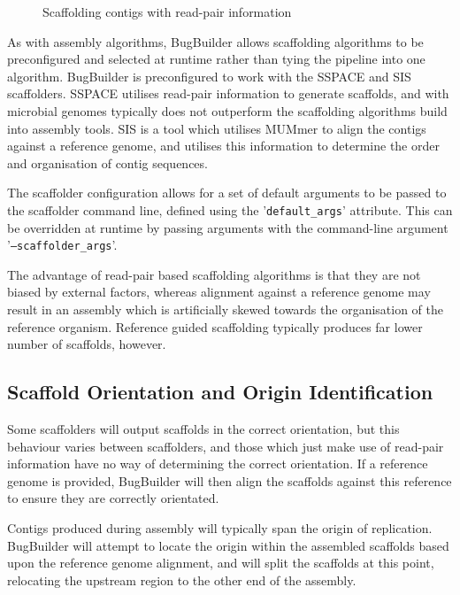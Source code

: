 \documentclass[a4paper,10pt]{article}
\begin{document}
\begin{figure}[ht]
\caption{Scaffolding contigs with read-pair information}
\label{fig:ReadPairScaffolding}
\end{figure}

As with assembly algorithms, BugBuilder allows scaffolding algorithms to be preconfigured and
selected at runtime rather than tying the pipeline into one algorithm. BugBuilder is preconfigured
to work with the SSPACE and SIS scaffolders. SSPACE utilises read-pair information to generate
scaffolds, and with microbial genomes typically does not outperform the scaffolding algorithms
build into assembly tools. SIS is a tool which utilises MUMmer to align the contigs against a
reference genome, and utilises this information to determine the order and organisation of contig
sequences.  

The scaffolder configuration allows for a set of default arguments to be passed to the scaffolder
command line, defined using the '{\tt default\_args}' attribute. This can be overridden at runtime
by passing arguments with the command-line argument '{\tt --scaffolder\_args}'. 

The advantage of read-pair based scaffolding algorithms is that they are not biased by external
factors, whereas alignment against a reference genome may result in an assembly which is
artificially skewed towards the organisation of the reference organism. Reference guided
scaffolding typically produces far lower number of scaffolds, however.

\subsection{Scaffold Orientation and Origin Identification}

Some scaffolders will output scaffolds in the correct orientation, but this behaviour varies
between scaffolders, and those which just make use of read-pair information have no way of
determining the correct orientation. If a reference genome is provided, BugBuilder will then align
the scaffolds against this reference to ensure they are correctly orientated. 

Contigs produced during assembly will typically span the origin of replication. BugBuilder will
attempt to locate the origin within the assembled scaffolds based upon the reference genome
alignment, and will split the scaffolds at this point, relocating the upstream region to the other
end of the assembly.
\end{document}
